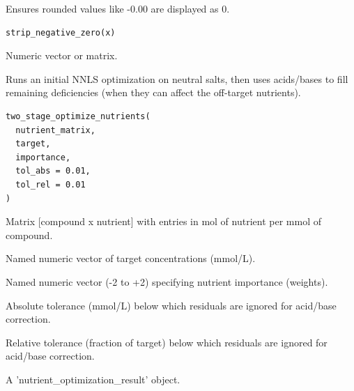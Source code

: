 \documentclass[a4paper]{book}
\begin{document}
%
\begin{Description}
Ensures rounded values like -0.00 are displayed as 0.
\end{Description}
%
\begin{Usage}
\begin{verbatim}
strip_negative_zero(x)
\end{verbatim}
\end{Usage}
%
\begin{Arguments}
\begin{ldescription}
\item[\code{x}] Numeric vector or matrix.
\end{ldescription}
\end{Arguments}
%
\begin{Description}
Runs an initial NNLS optimization on neutral salts, then uses acids/bases to
fill remaining deficiencies (when they can affect the off-target nutrients).
\end{Description}
%
\begin{Usage}
\begin{verbatim}
two_stage_optimize_nutrients(
  nutrient_matrix,
  target,
  importance,
  tol_abs = 0.01,
  tol_rel = 0.01
)
\end{verbatim}
\end{Usage}
%
\begin{Arguments}
\begin{ldescription}
\item[\code{nutrient\_matrix}] Matrix [compound x nutrient] with entries in mol of nutrient per mmol of compound.

\item[\code{target}] Named numeric vector of target concentrations (mmol/L).

\item[\code{importance}] Named numeric vector (-2 to +2) specifying nutrient importance (weights).

\item[\code{tol\_abs}] Absolute tolerance (mmol/L) below which residuals are ignored for acid/base correction.

\item[\code{tol\_rel}] Relative tolerance (fraction of target) below which residuals are ignored for acid/base correction.
\end{ldescription}
\end{Arguments}
%
\begin{Value}
A 'nutrient\_optimization\_result' object.
\end{Value}
\printindex{}
\end{document}
